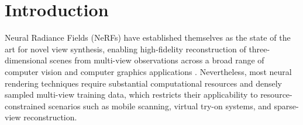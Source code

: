\section{Introduction}
\label{sec:intro}

Neural Radiance Fields (NeRFs) have established themselves as the state of the art  for novel view synthesis, enabling high-fidelity reconstruction of three-dimensional scenes from multi-view observations across a broad range of computer vision and computer graphics applications \cite{kerbl3Dgaussians, Tancik2023, substance3dviewer}. Nevertheless, most neural rendering techniques require substantial computational resources and densely sampled multi-view training data, which restricts their applicability to resource-constrained scenarios such as mobile scanning, virtual try-on systems, and sparse-view reconstruction.


